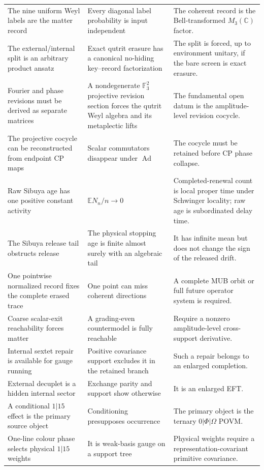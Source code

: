 \documentclass[11pt,oneside,openany]{book}
\numberwithin{equation}{chapter}
\theoremstyle{definition}
\theoremstyle{remark}
\newcommand{\C}{\mathbb C}
\newcommand{\Ad}{\operatorname{Ad}}
\begin{document}
\begin{longtable}{@{}p{}p{}p{}@{}}
The nine uniform Weyl labels are the matter record
& Every diagonal label probability is input independent
& The coherent record is the Bell-transformed \(M_3(\C)\) factor.\\
The external/internal split is an arbitrary product ansatz
& Exact qutrit erasure has a canonical no-hiding key--record factorization
& The split is forced, up to environment unitary, if the bare screen is exact
  erasure.\\
Fourier and phase revisions must be derived as separate matrices
& A nondegenerate \(\mathbb F_3^2\) projective revision section forces the
  qutrit Weyl algebra and its metaplectic lifts
& The fundamental open datum is the amplitude-level revision cocycle.\\
The projective cocycle can be reconstructed from endpoint CP maps
& Scalar commutators disappear under \(\Ad\)
& The cocycle must be retained before CP phase collapse.\\
Raw Sibuya age has one positive constant activity
& \(\mathbb EN_n/n\to0\)
& Completed-renewal count is local proper time under Schwinger locality; raw
  age is subordinated delay time.\\
The Sibuya release tail obstructs release
& The physical stopping age is finite almost surely with an algebraic tail
& It has infinite mean but does not change the sign of the released drift.\\
One pointwise normalized record fixes the complete erased trace
& One point can miss coherent directions
& A complete MUB orbit or full future operator system is required.\\
Coarse scalar-exit reachability forces matter
& A grading-even countermodel is fully reachable
& Require a nonzero amplitude-level cross-support derivative.\\
Internal sextet repair is available for gauge running
& Positive covariance support excludes it in the retained branch
& Such a repair belongs to an enlarged completion.\\
External decuplet is a hidden internal sector
& Exchange parity and support show otherwise
& It is an enlarged EFT.\\
A conditional \(1|15\) effect is the primary source object
& Conditioning presupposes occurrence
& The primary object is the ternary \(0|\Phi|\Omega\) POVM.\\
One-line colour phase selects physical \(1|15\) weights
& It is weak-basis gauge on a support tree
& Physical weights require a representation-covariant primitive covariance.\\

\end{longtable}
\end{document}

